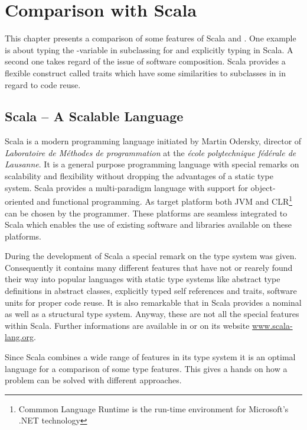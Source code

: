 \chapter{Comparison with Scala}
\label{sec:comparisonScala}
This chapter presents a comparison of some features of Scala and \ooplss.
One example is about typing the \self-variable in subclassing for
\ooplss and explicitly typing in Scala. A second one takes regard of the
issue of software composition. Scala provides a flexible construct called
traits which have some similarities to subclasses in \ooplss in regard to
code reuse.

\section{Scala -- A Scalable Language}
Scala is a modern programming language initiated by Martin Odersky,
director of \emph{Laboratoire de Méthodes de programmation} at the
\emph{école polytechnique fédérale de Lausanne}. It is a general
purpose programming language with special remarks on scalability
and flexibility without dropping the advantages of a static type
system. Scala provides a multi-paradigm language with support for
object-oriented and functional programming. As target platform both JVM
and CLR\footnote{Commmon Language Runtime is the run-time environment
for Microsoft's .NET technology} can be chosen by the programmer. These
platforms are seamless integrated to Scala which enables the use of
existing software and libraries available on these platforms.

During the development of Scala a special remark on the type system was
given. Consequently it contains many different features that have not or
rearely found their way into popular languages with static type systems
like abstract type definitions in abstract classes, explicitly typed self
references and traits, software units for proper code reuse. It is also
remarkable that in Scala provides a nominal as well as a structural
type system. Anyway, these are not all the special features within
Scala. Further informations are available in
\cite{odersky_scala_2010,odersky_programming_2008} or on its website
\href{http://www.scala-lang.org/}{www.scala-lang.org}.

Since Scala combines a wide range of features in its type system it is
an optimal language for a comparison of some type features. This gives
a hands on how a problem can be solved with different approaches.

